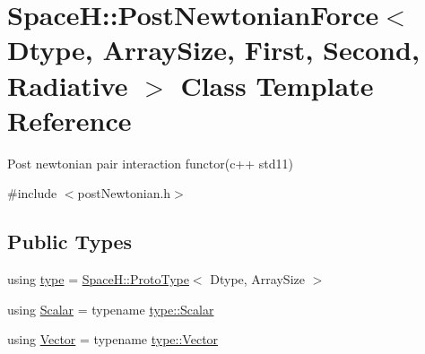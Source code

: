 \hypertarget{class_space_h_1_1_post_newtonian_force}{}\section{SpaceH\+:\+:Post\+Newtonian\+Force$<$ Dtype, Array\+Size, First, Second, Radiative $>$ Class Template Reference}
\label{class_space_h_1_1_post_newtonian_force}


Post newtonian pair interaction functor(c++ std11)  




{\ttfamily \#include $<$post\+Newtonian.\+h$>$}

\subsection*{Public Types}
\begin{DoxyCompactItemize}
\item 
using \mbox{\hyperlink{class_space_h_1_1_post_newtonian_force_a51db63e61431148f38ada0ca11f55ae6}{type}} = \mbox{\hyperlink{struct_space_h_1_1_proto_type}{Space\+H\+::\+Proto\+Type}}$<$ Dtype, Array\+Size $>$
\item 
using \mbox{\hyperlink{class_space_h_1_1_post_newtonian_force_a4c47b7292998ddda142216f6b614bedd}{Scalar}} = typename \mbox{\hyperlink{struct_space_h_1_1_proto_type_af3c8245d83d9db64749882920de5c274}{type\+::\+Scalar}}
\item 
using \mbox{\hyperlink{class_space_h_1_1_post_newtonian_force_ae9a942fc7a0c5fa260d7e8a17cb107bd}{Vector}} = typename \mbox{\hyperlink{struct_space_h_1_1_proto_type_a316b81f4660b2b4fab14a8e1f23b6089}{type\+::\+Vector}}
\end{DoxyCompactItemize}
